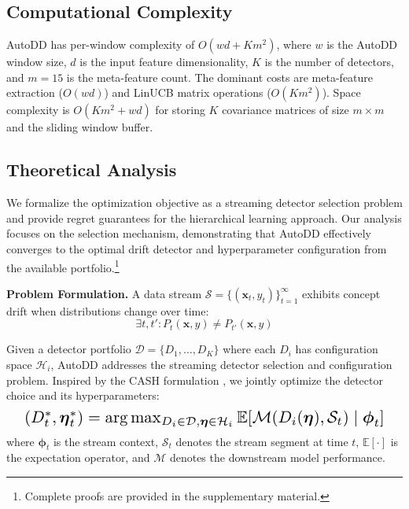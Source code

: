 \documentclass{article}
\begin{document}
\subsection{Computational Complexity}
AutoDD has per-window complexity of $O(wd + Km^2)$, where $w$ is the AutoDD window size, $d$ is the input feature dimensionality, $K$ is the number of detectors, and $m=15$ is the meta-feature count. The dominant costs are meta-feature extraction ($O(wd)$) and LinUCB matrix operations ($O(Km^2)$). Space complexity is $O(Km^2 + wd)$ for storing $K$ covariance matrices of size $m \times m$ and the sliding window buffer.

\subsection{Theoretical Analysis}

We formalize the optimization objective as a streaming detector selection problem and provide regret guarantees for the hierarchical learning approach. Our analysis focuses on the selection mechanism, demonstrating that AutoDD effectively converges to the optimal drift detector and hyperparameter configuration from the available portfolio.\footnote{Complete proofs are provided in the supplementary material.}

\textbf{Problem Formulation.} A data stream $\mathcal{S} = \{(\mathbf{x}_t, y_t)\}_{t=1}^{\infty}$ exhibits concept drift when distributions change over time:
\begin{equation}
\exists t, t' : P_t(\mathbf{x}, y) \neq P_{t'}(\mathbf{x}, y)
\end{equation}

Given a detector portfolio $\mathcal{D} = \{D_1, \ldots, D_K\}$ where each $D_i$ has configuration space $\mathcal{H}_i$, AutoDD addresses the streaming detector selection and configuration problem. Inspired by the CASH formulation \cite{Hutter2019AutoML}, we jointly optimize the detector choice and its hyperparameters:
\begin{equation}
\resizebox{0.95\columnwidth}{!}{$
(D^*_t, \boldsymbol{\eta}^*_t) = \arg\max_{D_i \in \mathcal{D}, \boldsymbol{\eta} \in \mathcal{H}_i} \mathbb{E}[\mathcal{M}(D_i(\boldsymbol{\eta}), \mathcal{S}_t) \mid \boldsymbol{\phi}_t]
$}
\end{equation}
where $\boldsymbol{\phi}_t$ is the stream context, $\mathcal{S}_t$ denotes the stream segment at time $t$, $\mathbb{E}[\cdot]$ is the expectation operator, and $\mathcal{M}$ denotes the downstream model performance.
\end{document}

